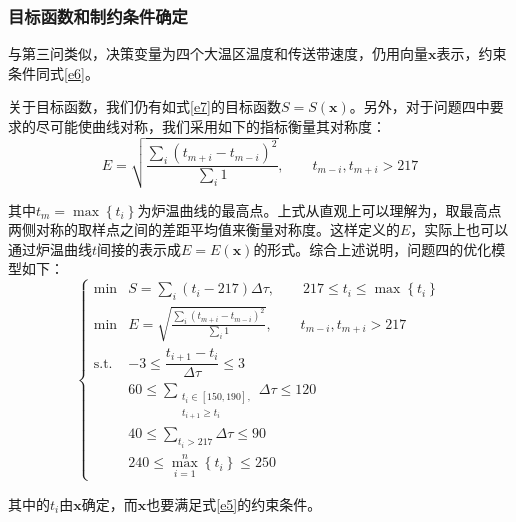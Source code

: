 \documentclass[a4paper,12pt]{ctexart} %
\begin{document}
	\subsubsection{目标函数和制约条件确定}
	与第三问类似，决策变量为四个大温区温度和传送带速度，仍用向量$\boldsymbol{x}$表示，约束条件同式\ref{e6}。\par
	关于目标函数，我们仍有如式\ref{e7}的目标函数$S = S(\boldsymbol{x})$。另外，对于问题四中要求的尽可能使曲线对称，我们采用如下的指标衡量其对称度：
	\begin{equation}
	E = \sqrt{\frac{\sum\limits_{i}\left(t_{m+i} - t_{m-i}\right)^2}{\sum\limits_{i} 1}},\quad\quad t_{m-i},t_{m+i}>217
	\end{equation}\par
	其中$t_m = \max\left\{t_i\right\}$为炉温曲线的最高点。上式从直观上可以理解为，取最高点两侧对称的取样点之间的差距平均值来衡量对称度。这样定义的$E$，实际上也可以通过炉温曲线$t$间接的表示成$E = E(\boldsymbol{x})$的形式。综合上述说明，问题四的优化模型如下：
	\begin{equation}
	\begin{cases}
	\min &S=\sum\limits_{i}(t_i-217)\varDelta\tau,\quad\quad 217\leqslant t_i\leqslant\max\left\{{t_i}\right\}\\[1em]
	\min &E =\sqrt{\frac{\sum\limits_{i}\left(t_{m+i} - t_{m-i}\right)^2}{\sum\limits_{i} 1}},\quad\quad t_{m-i},t_{m+i}>217\\[1em]
	\text{s.t.}&-3\leqslant\dfrac{t_{i+1}-t_i}{\varDelta\tau}\leqslant 3\\[1em]
	&60\leqslant\sum\limits_{\begin{smallmatrix}
		t_i\in[150,190],\\
		t_{i+1}\geqslant t_i
		\end{smallmatrix}} \varDelta\tau\leqslant 120\\[1em]
	&40\leqslant\sum\limits_{t_i>217}\varDelta\tau\leqslant 90\\[1em]
	&240\leqslant\max\limits_{i=1}^{n}\left\{t_i\right\}\leqslant 250
	\end{cases}
	\end{equation}\par
	其中的$t_i$由$\boldsymbol{x}$确定，而$\boldsymbol{x}$也要满足式\ref{e5}的约束条件。
\end{document}
